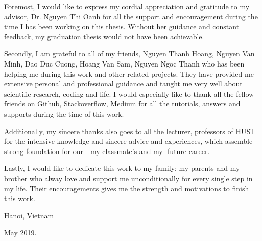 \begin{acknowledgement}
\hspace{0.5cm}Foremost, I would like to express my cordial appreciation and gratitude to my advisor, 
Dr. Nguyen Thi Oanh for all the support and encouragement during the time I has been working on this thesis. 
Without her guidance and constant feedback, my graduation thesis would not have been
achievable.\par
Secondly, I am grateful to all of my friends, Nguyen Thanh Hoang, Nguyen Van Minh, Dao Duc Cuong, Hoang Van Sam, Nguyen Ngoc Thanh 
 who has been helping me during this work and other related projects.
They have provided me extensive personal and professional guidance and taught me very well about scientific research, coding and life.
I would especially like to thank all the fellow friends on Github, Stackoverflow, Medium for all the tutorials, answers and supports during the time
of this work.\par
Additionally, my sincere thanks also goes to all the lecturer, professors of HUST for the intensive knowledge and sincere
advice and experiences, which assemble strong foundation for our - my classmate's and my- future career.\par 

Lastly, I would like to dedicate this work to my family; my parents and my brother who alway love and support me unconditionally for
every single step in my life. Their encouragements gives me the strength and motivations to finish this work.\par
Hanoi, Vietnam\par
May 2019.





\end{acknowledgement}
